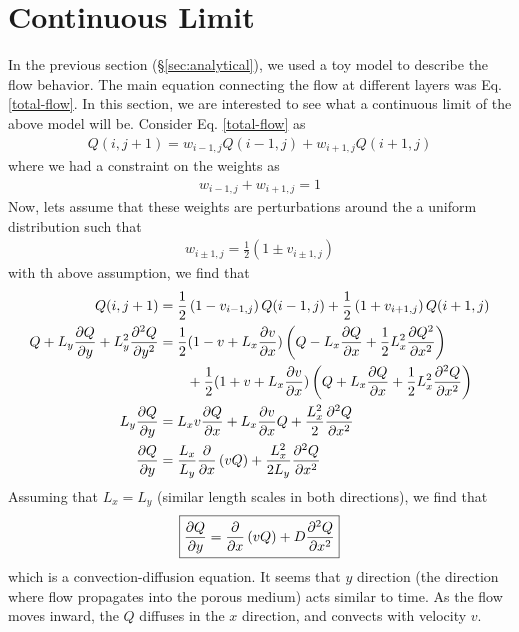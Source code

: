 \section{Continuous Limit}
%
In the previous section (\S \ref{sec:analytical}), we used a toy model
to describe the flow behavior. The main equation connecting the flow
at different layers was Eq. \eqref{total-flow}. In this section, we
are interested to see what a continuous limit of the above model will
be. Consider Eq. \eqref{total-flow} as
%
\begin{align}
  Q(i,j+1) = w_{i-1,j} Q(i-1,j) + w_{i+1,j} Q(i+1,j) 
\end{align}
%
where we had a constraint on the weights as 
%
\begin{align}
  w_{i-1,j} + w_{i+1,j} = 1
\end{align}
%
Now, lets assume that these weights are perturbations around the a
uniform distribution such that
%
\begin{align}
  w_{i\pm 1,j}= \frac{1}{2}( 1 \pm v_{i\pm 1,j})
\end{align}
%
with th above assumption, we find that
%
\begin{align}
  Q(i,j+1) & = \frac{1}{2} \left( 1 - v_{i- 1,j}\right) Q(i-1,j) + \frac{1}{2} \left( 1 + v_{i+ 1,j}\right) Q(i+1,j)  \\
  Q + L_y \frac{\partial Q}{\partial y } + L^2_y \frac{\partial^{2}Q}{\partial y^2}  & = \frac{1}{2} (1-v + L_x \frac{\partial v}{\partial x}  ) \left( Q - L_x \frac{\partial Q}{\partial x} +   \frac{1}{2} L_x^2 \frac{\partial Q^2}{\partial x^2}\right) \nonumber\\
 & \qquad   +\frac{1}{2}  (1+v + L_x \frac{\partial v}{\partial x} )\left( Q + L_x \frac{\partial Q}{\partial x} + \frac{1}{2}L_x^2 \frac{\partial^2 Q}{\partial x^2} \right)  \\
  L_y \frac{\partial Q}{\partial y } & = L_x v \frac{\partial Q}{\partial x} + L_x \frac{\partial v}{\partial x} Q + \frac{L^2_x}{2} \frac{\partial^{2}Q}{\partial x^2}  \\
  \frac{\partial Q}{\partial y}    & = \frac{L_{x}}{L_{y}} \frac{\partial }{\partial x} \left( v Q \right)  + \frac{L^2_x}{2L_y} \frac{\partial^{2}Q}{\partial x^2}  
\end{align}
%
Assuming that $L_x = L_y $ (similar length scales in both directions),
we find that
%
\begin{align}
\boxed{\frac{\partial Q}{\partial y}  = \frac{\partial}{\partial x} \left( v Q\right) + D \frac{\partial^{2} Q}{\partial x^2}  }
\end{align}
%
which is a convection-diffusion equation.  It seems that $y$ direction
(the direction where flow propagates into the porous medium) acts
similar to time. As the flow moves inward, the $Q$ diffuses in the $x$
direction, and convects with velocity $v$. 



